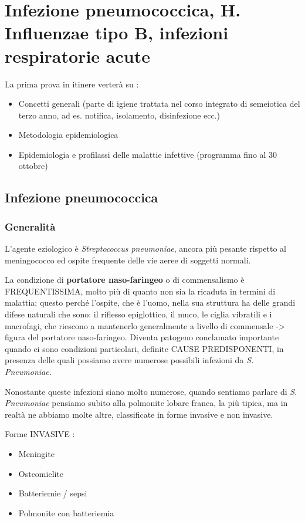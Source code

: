 \section{Infezione pneumococcica, H. Influenzae tipo B, infezioni respiratorie acute}

La prima prova in itinere verterà su :
\begin{itemize}
\item Concetti generali (parte di igiene trattata nel corso integrato di
semeiotica del terzo anno, ad es. notifica, isolamento, disinfezione
ecc.)
\item Metodologia epidemiologica
\item Epidemiologia e profilassi delle malattie infettive (programma fino al
30 ottobre)
\end{itemize}

\subsection{Infezione pneumococcica}

\subsubsection{Generalità}

L'agente eziologico è \emph{Streptococcus pneumoniae}, ancora più
pesante rispetto al meningococco ed ospite frequente delle vie aeree di
soggetti normali.

La condizione di \textbf{portatore naso-faringeo} o di commensalismo è
FREQUENTISSIMA, molto più di quanto non sia la ricaduta in termini di
malattia; questo perché l'ospite, che è l'uomo, nella sua struttura ha
delle grandi difese naturali che sono: il riflesso epiglottico, il muco,
le ciglia vibratili e i macrofagi, che riescono a mantenerlo
generalmente a livello di commensale -> figura del portatore
naso-faringeo. Diventa patogeno conclamato importante quando ci sono
condizioni particolari, definite CAUSE PREDISPONENTI, in presenza delle
quali possiamo avere numerose possibili infezioni da \emph{S.
Pneumoniae.}

Nonostante queste infezioni siano molto numerose, quando sentiamo
parlare di \emph{S. Pneumoniae} pensiamo subito alla polmonite lobare
franca, la più tipica, ma in realtà ne abbiamo molte altre, classificate
in forme invasive e non invasive.

Forme INVASIVE :

\begin{itemize}
\item
  Meningite
\item
  Osteomielite
\item
  Batteriemie / sepsi
\item
  Polmonite con batteriemia
\end{itemize}
  
